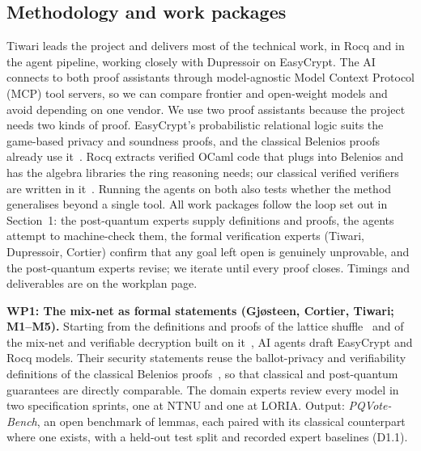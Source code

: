 \documentclass[11pt]{article}
\begin{document}
\subsection{Methodology and work packages}
Tiwari leads the project and delivers most of the technical work, in Rocq and in the agent pipeline, working
closely with Dupressoir on EasyCrypt. The AI connects to both proof
assistants through model-agnostic Model Context Protocol (MCP) tool servers, so we can compare frontier and
open-weight models and avoid depending on one vendor. We use two proof assistants because the project needs two
kinds of proof. EasyCrypt's probabilistic relational logic suits the game-based privacy and soundness proofs, and
the classical Belenios proofs already use it~\cite{cortier2017sp,cortier2018belenioseasycrypt}. Rocq extracts
verified OCaml code that plugs into Belenios and has the algebra libraries the ring reasoning needs; our classical
verified verifiers are written in it~\cite{haines2019verified,287095}. Running the agents on both also tests whether
the method generalises beyond a single tool. All work packages follow the loop set out in Section~1: the post-quantum
experts supply definitions and proofs, the agents attempt to machine-check them, the formal verification experts
(Tiwari, Dupressoir, Cortier) confirm that any goal left open is genuinely unprovable, and the post-quantum experts
revise; we iterate until every proof closes. Timings and deliverables are on the workplan page.

\textbf{WP1: The mix-net as formal statements (Gj{\o}steen, Cortier, Tiwari; M1--M5).} Starting from the definitions
and proofs of the lattice shuffle~\cite{aranha2021shuffle} and of the mix-net and verifiable decryption built on
it~\cite{aranha2023mixnet}, AI agents draft EasyCrypt and Rocq models. Their security statements reuse the
ballot-privacy and verifiability definitions of the classical Belenios
proofs~\cite{cortier2017sp,cortier2018belenioseasycrypt}, so that classical and post-quantum guarantees are directly
comparable. The domain experts review every model in two specification sprints, one at NTNU and one at LORIA. Output: \emph{PQVote-Bench}, an open
benchmark of lemmas, each paired with its classical counterpart where one exists, with a held-out test split and
recorded expert baselines (D1.1).
\end{document}
